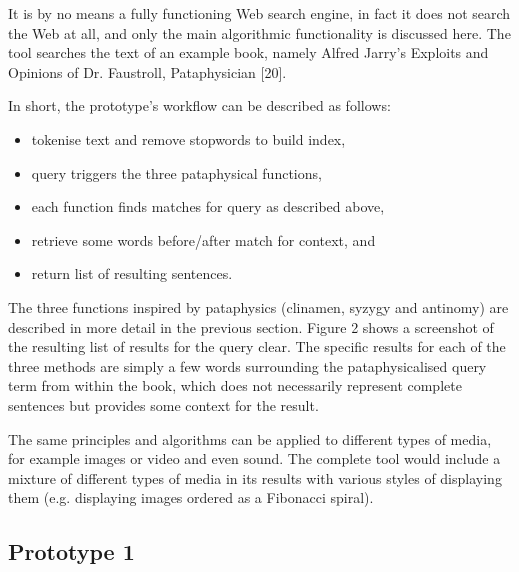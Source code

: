 It is by no means a fully functioning Web search engine, in fact it does not search the Web at all, and only the main algorithmic functionality is discussed here. The tool searches the text of an example book, namely Alfred Jarry’s Exploits and Opinions of Dr. Faustroll, Pataphysician [20].

In short, the prototype’s workflow can be described as follows:
\begin{itemize}
  \item tokenise text and remove stopwords to build index,
  \item query triggers the three pataphysical functions,
  \item each function finds matches for query as described above,
  \item retrieve some words before/after match for context, and
  \item return list of resulting sentences.
\end{itemize}

The three functions inspired by pataphysics (clinamen, syzygy and antinomy) are described in more detail in the previous section. Figure 2 shows a screenshot of the resulting list of results for the query clear. The specific results for each of the three methods are simply a few words surrounding the pataphysicalised query term from within the book, which does not necessarily represent complete sentences but provides some context for the result.

The same principles and algorithms can be applied to different types of media, for example images or video and even sound. The complete tool would include a mixture of different types of media in its results with various styles of displaying them (e.g. displaying images ordered as a Fibonacci spiral).

\subsection{Prototype 1}

